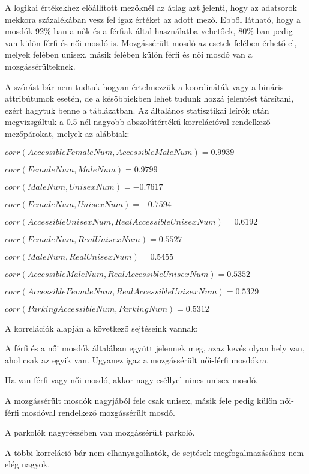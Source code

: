 	A logikai értékekhez előállított mezőknél az átlag azt jelenti, hogy az adatsorok mekkora százalékában vesz fel igaz értéket az adott mező. Ebből látható, hogy a mosdók 92\%-ban a nők és a férfiak által használatba vehetőek, 80\%-ban pedig van külön férfi és női mosdó is. Mozgássérült mosdó az esetek felében érhető el, melyek felében unisex, másik felében külön férfi és női mosdó van a mozgássérülteknek.\par
	A szórást bár nem tudtuk hogyan értelmezzük a koordináták vagy a bináris attribútumok esetén, de a későbbiekben lehet tudunk hozzá jelentést társítani, ezért hagytuk benne a táblázatban.
	Az általános statisztikai leírók után megvizsgáltuk a 0.5-nél nagyobb abszolútértékű korrelációval rendelkező mezőpárokat, melyek az alábbiak:
	\begin{compactlist}			
		\item $corr(AccessibleFemaleNum, AccessibleMaleNum) = 0.9939$
		\item $corr(FemaleNum, MaleNum) = 0.9799$
		\item $corr(MaleNum, UnisexNum) = -0.7617$
		\item $corr(FemaleNum, UnisexNum) = -0.7594$
		\item $corr(AccessibleUnisexNum, RealAccessibleUnisexNum) = 0.6192$
		\item $corr(FemaleNum, RealUnisexNum) = 0.5527$
		\item $corr(MaleNum, RealUnisexNum) = 0.5455$
		\item $corr(AccessibleMaleNum, RealAccessibleUnisexNum) = 0.5352$
		\item $corr(AccessibleFemaleNum, RealAccessibleUnisexNum) = 0.5329$
		\item $corr(ParkingAccessibleNum, ParkingNum) = 0.5312$
	\end{compactlist}\par
	A korrelációk alapján a következő sejtéseink vannak:
	\begin{compactlist}			
		\item A férfi és a női mosdók általában együtt jelennek meg, azaz kevés olyan hely van, ahol csak az egyik van. Ugyanez igaz a mozgássérült női-férfi mosdókra.
		\item Ha van férfi vagy női mosdó, akkor nagy eséllyel nincs unisex mosdó.
		\item A mozgássérült mosdók nagyjából fele csak unisex, másik fele pedig külön női-férfi mosdóval rendelkező mozgássérült mosdó.
		\item A parkolók nagyrészében van mozgássérült parkoló.
	\end{compactlist}
	A többi korreláció bár nem elhanyagolhatók, de sejtések megfogalmazásához nem elég nagyok.
